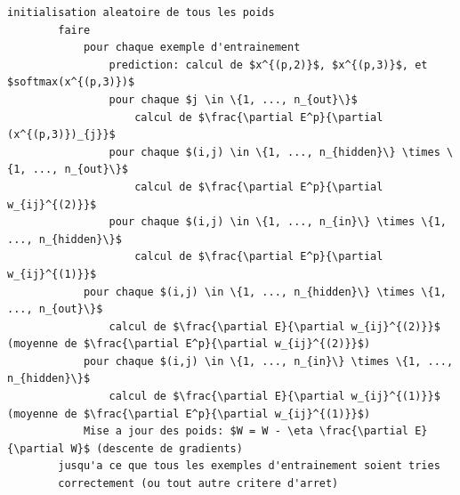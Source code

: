 \documentclass[a4paper,11pt,oneside,roman]{article}
\begin{document}
    \begin{lstlisting}[mathescape]
        initialisation aleatoire de tous les poids
        faire
            pour chaque exemple d'entrainement
                prediction: calcul de $x^{(p,2)}$, $x^{(p,3)}$, et $softmax(x^{(p,3)})$
                pour chaque $j \in \{1, ..., n_{out}\}$
                    calcul de $\frac{\partial E^p}{\partial (x^{(p,3)})_{j}}$
                pour chaque $(i,j) \in \{1, ..., n_{hidden}\} \times \{1, ..., n_{out}\}$
                    calcul de $\frac{\partial E^p}{\partial w_{ij}^{(2)}}$
                pour chaque $(i,j) \in \{1, ..., n_{in}\} \times \{1, ..., n_{hidden}\}$
                    calcul de $\frac{\partial E^p}{\partial w_{ij}^{(1)}}$
            pour chaque $(i,j) \in \{1, ..., n_{hidden}\} \times \{1, ..., n_{out}\}$
                calcul de $\frac{\partial E}{\partial w_{ij}^{(2)}}$ (moyenne de $\frac{\partial E^p}{\partial w_{ij}^{(2)}}$)
            pour chaque $(i,j) \in \{1, ..., n_{in}\} \times \{1, ..., n_{hidden}\}$
                calcul de $\frac{\partial E}{\partial w_{ij}^{(1)}}$ (moyenne de $\frac{\partial E^p}{\partial w_{ij}^{(1)}}$)
            Mise a jour des poids: $W = W - \eta \frac{\partial E}{\partial W}$ (descente de gradients)
        jusqu'a ce que tous les exemples d'entrainement soient tries 
        correctement (ou tout autre critere d'arret)
    \end{lstlisting}

    
\end{document}
